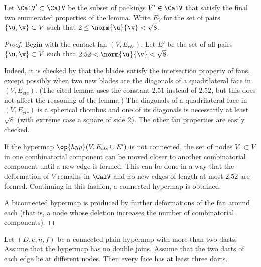 \begin{definition}[$\CalV'$,~$E_V$]
%
%
Let $\CalV'\subset\CalV$ be the subset of packings $V'\in\CalV$ that
satisfy the final two enumerated properties of the lemma.  Write
$E_V$ for the set of pairs $\{\u,\v\}\subset V$
  such that $2\le\norm{\u}{\v} <\sqrt8$.
\end{definition}

\begin{proof}
  Begin with the contact fan $(V,E_{ctc})$.  Let $E'$ be the set
  of all pairs $\{\u,\v\}\subset V$ such that
  $2.52<\norm{\u}{\v}<\sqrt8$.

   Indeed, it is checked by
  \cite[Lemma~4.30]{Hales:2006:DCG} that the blades satisfy the
  intersection property of fans, except possibly when two new blades
  are the diagonals of a quadrilateral face in $(V,E_{ctc})$.  (The
  cited lemma uses the constant $2.51$ instead of $2.52$, but this
  does not affect the reasoning of the lemma.)  The diagonals of a quadrilateral face
  in $(V,E_{ctc})$ is a spherical rhombus and one of its diagonals is
  necessarily at least $\sqrt8$ (with extreme case a square of side
  $2$).  The other fan properties are easily checked.

  If the hypermap $\op{hyp}(V,E_{ctc}\cup E')$ is not connected,
  the set of nodes $V_1\subset V$ in one combinatorial component can
  be moved closer to another combinatorial component until a new edge
  is formed.  This can be done in a way that the deformation of $V$
  remains in $\CalV$ and no new edges of length at most $2.52$ are formed.
  Continuing in this fashion, a connected hypermap is obtained.

A biconnected hypermap is produced by  further
 deformations of the fan around each   (that is, a node 
whose deletion increases the number of combinatorial components).
\end{proof}


\begin{lemma}\label{lemma:dj}
Let $(D,e,n,f)$ be a connected plain hypermap with more than
two darts.  Assume that the hypermap has no  double joins. Assume that the
two darts of each edge lie at different nodes.
Then
every face has at least three darts.
\end{lemma}

